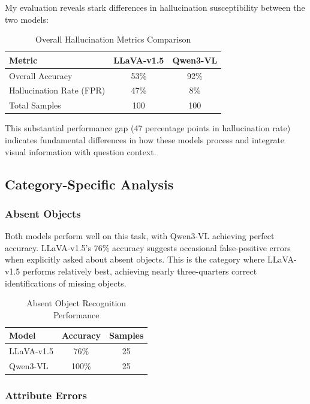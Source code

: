 \documentclass[11pt,a4paper]{article}
\begin{document}
My evaluation reveals stark differences in hallucination susceptibility between the two models:

\begin{table}[h]
\centering
\begin{tabular}{lcc}
\toprule
\textbf{Metric} & \textbf{LLaVA-v1.5} & \textbf{Qwen3-VL} \\
\midrule
Overall Accuracy & 53\% & 92\% \\
Hallucination Rate (FPR) & 47\% & 8\% \\
Total Samples & 100 & 100 \\
\bottomrule
\end{tabular}
\caption{Overall Hallucination Metrics Comparison}
\end{table}

This substantial performance gap (47 percentage points in hallucination rate) indicates fundamental differences in how these models process and integrate visual information with question context.

\subsection{Category-Specific Analysis}

\subsubsection{Absent Objects}

Both models perform well on this task, with Qwen3-VL achieving perfect accuracy. LLaVA-v1.5's 76\% accuracy suggests occasional false-positive errors when explicitly asked about absent objects. This is the category where LLaVA-v1.5 performs relatively best, achieving nearly three-quarters correct identifications of missing objects.

\vspace{10pt}
\begin{table}[h]
\centering
\begin{tabular}{lcc}
\toprule
\textbf{Model} & \textbf{Accuracy} & \textbf{Samples} \\
\midrule
LLaVA-v1.5 & 76\% & 25 \\
Qwen3-VL & 100\% & 25 \\
\bottomrule
\end{tabular}
\caption{Absent Object Recognition Performance}
\end{table}

\subsubsection{Attribute Errors}
\end{document}
